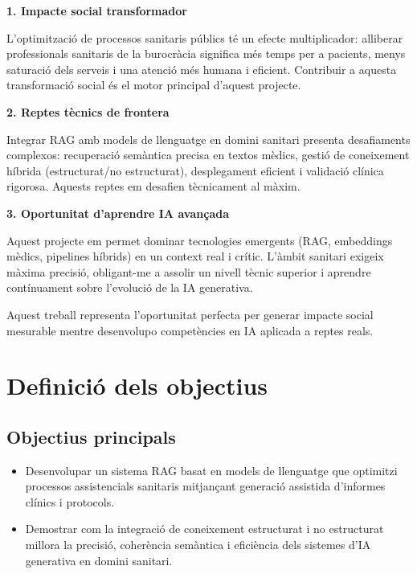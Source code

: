 \documentclass[11pt,a4paper]{article}
\begin{document}
\textbf{1. Impacte social transformador}  

L'optimització de processos sanitaris públics té un efecte multiplicador: alliberar professionals sanitaris de la burocràcia significa més temps per a pacients, menys saturació dels serveis i una atenció més humana i eficient. Contribuir a aquesta transformació social és el motor principal d'aquest projecte.

\textbf{2. Reptes tècnics de frontera}  

Integrar RAG amb models de llenguatge en domini sanitari presenta desafiaments complexos: recuperació semàntica precisa en textos mèdics, gestió de coneixement híbrida (estructurat/no estructurat), desplegament eficient i validació clínica rigorosa. Aquests reptes em desafien tècnicament al màxim.

\textbf{3. Oportunitat d'aprendre IA avançada}  

Aquest projecte em permet dominar tecnologies emergents (RAG, embeddings mèdics, pipelines híbrids) en un context real i crític. L'àmbit sanitari exigeix màxima precisió, obligant-me a assolir un nivell tècnic superior i aprendre contínuament sobre l'evolució de la IA generativa.

Aquest treball representa l'oportunitat perfecta per generar impacte social mesurable mentre desenvolupo competències en IA aplicada a reptes reals.









\section*{Definició dels objectius}

\subsection*{Objectius principals}
\begin{itemize}
\item Desenvolupar un sistema RAG basat en models de llenguatge que optimitzi processos assistencials sanitaris mitjançant generació assistida d'informes clínics i protocols.
\item Demostrar com la integració de coneixement estructurat i no estructurat millora la precisió, coherència semàntica i eficiència dels sistemes d'IA generativa en domini sanitari.
\end{itemize}
\end{document}
